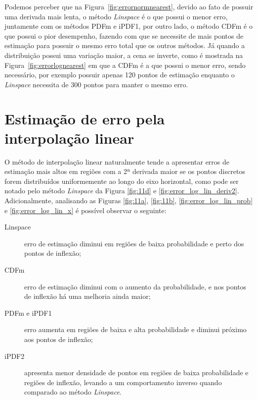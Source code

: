 Podemos perceber que na Figura~\ref{fig:errornormnearest}, devido ao fato de possuir uma derivada mais lenta, o método \textit{Linspace} é o que possui o menor erro, juntamente com os métodos \ac{PDFm} e \ac{iPDF1}, por outro lado, o método \ac{CDFm} é o que possui o pior desempenho, fazendo com que se necessite de mais pontos de estimação para possuir o mesmo erro total que os outros métodos. Já quando a distribuição possui uma variação maior, a cena se inverte, como é mostrada na Figura~\ref{fig:errorlognearest} em que a \ac{CDFm} é a que possui o menor erro, sendo necessário, por exemplo possuir apenas 120 pontos de estimação enquanto o \textit{Linspace} necessita de 300 pontos para manter o mesmo erro.


\section{Estimação de erro pela interpolação linear} \label{cap:interp_lin}

O método de interpolação linear naturalmente tende a apresentar erros de estimação mais altos em regiões com a 2ª derivada maior se os pontos discretos forem distribuídos uniformemente ao longo do eixo horizontal, como pode ser notado pelo método \textit{Linspace} da Figura \ref{fig:11d} e \ref{fig:error_log_lin_deriv2}. Adicionalmente, analisando as Figuras \ref{fig:11a}, \ref{fig:11b}, \ref{fig:error_log_lin_prob} e \ref{fig:error_log_lin_x} é possível observar o seguinte:

\begin{description}
	\item[Linspace] erro de estimação diminui em regiões de baixa probabilidade e perto dos pontos de inflexão;
	\item[CDFm] erro de estimação diminui com o aumento da probabilidade, e nos pontos de inflexão há uma melhoria ainda maior;
	\item [PDFm e iPDF1] erro aumenta em regiões de baixa e alta probabilidade e diminui próximo aos pontos de inflexão;
	\item[iPDF2] apresenta menor densidade de pontos em regiões de baixa probabilidade e regiões de inflexão, levando a um comportamento inverso quando comparado ao método \textit{Linspace}.
\end{description}   


